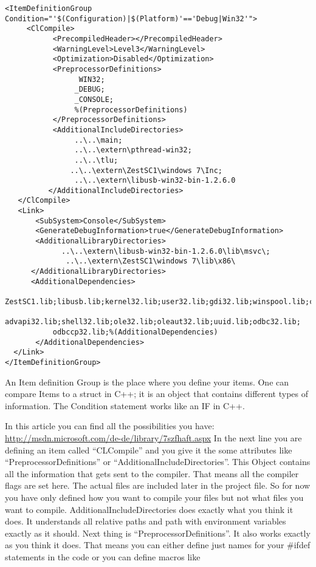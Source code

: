 {
\footnotesize
\lstset{language=XML}
\begin{lstlisting}
<ItemDefinitionGroup Condition="'$(Configuration)|$(Platform)'=='Debug|Win32'">
     <ClCompile>
           <PrecompiledHeader></PrecompiledHeader>
           <WarningLevel>Level3</WarningLevel>
           <Optimization>Disabled</Optimization>
           <PreprocessorDefinitions>
                 WIN32;
                _DEBUG;
                _CONSOLE;
                %(PreprocessorDefinitions)
           </PreprocessorDefinitions>
           <AdditionalIncludeDirectories>
                ..\..\main;
                ..\..\extern\pthread-win32;
                ..\..\tlu;
               ..\..\extern\ZestSC1\windows 7\Inc;
                ..\..\extern\libusb-win32-bin-1.2.6.0
          </AdditionalIncludeDirectories>
   </ClCompile>
   <Link>
       <SubSystem>Console</SubSystem>
       <GenerateDebugInformation>true</GenerateDebugInformation>
       <AdditionalLibraryDirectories>
             ..\..\extern\libusb-win32-bin-1.2.6.0\lib\msvc\;
              ..\..\extern\ZestSC1\windows 7\lib\x86\
      </AdditionalLibraryDirectories>
      <AdditionalDependencies>
           ZestSC1.lib;libusb.lib;kernel32.lib;user32.lib;gdi32.lib;winspool.lib;comdlg32.lib;
           advapi32.lib;shell32.lib;ole32.lib;oleaut32.lib;uuid.lib;odbc32.lib;
           odbccp32.lib;%(AdditionalDependencies)
       </AdditionalDependencies>
  </Link> 
</ItemDefinitionGroup>
\end{lstlisting}
}

An Item definition Group is the place where you define your items. One can compare Items to a struct in C++; it is an object that contains different types of information. The Condition statement works like an IF in C++. 

In this article you can find all the possibilities you have: \url{http://msdn.microsoft.com/de-de/library/7szfhaft.aspx}
In the next line you are defining an item called ``CLCompile'' and you give it the some attributes like ``PreprocessorDefinitions'' or ``AdditionalIncludeDirectories''. This Object contains all the information that gets sent to the compiler. That means all the compiler flags are set here. The actual files are included later in the project file. So for now you have only defined how you want to compile your files but not what files you want to compile. AdditionalIncludeDirectories does exactly what you think it does. It understands all relative paths and path with environment variables exactly as it should. Next thing is ``PreprocessorDefinitions''. It also works exactly as you think it does. That means you can either define just names for your \ensuremath{\#}ifdef statements in the code or you can define macros like


